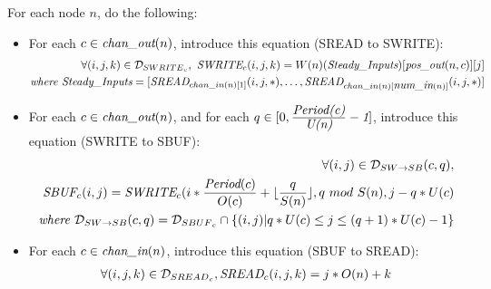 \noindent For each node $n$, do the following:
\begin{itemize}

\item For each $c \in \mbox{\it chan\_out}(n)$, introduce this equation
(SREAD to SWRITE):
%
\begin{align*}
\forall (i, j, k) \in {\cal D}_{{SWRITE}_{c}},~\mbox{\it SWRITE}_{c}(i,j,k) = W(n)(\mbox{\it Steady\_Inputs})[\mbox{\it pos\_out}(n, c)][j] \\
\mbox{\it where Steady\_Inputs} = [\mbox{\it SREAD}_{{chan\_in}(n)[1]}(i, j, *), \dots, 
                             \mbox{\it SREAD}_{{chan\_in}(n)[\mbox{\it num\_in}(n)]}(i, j, *) ]
\end{align*}
%
\item For each $c \in \mbox{\it chan\_out}(n)$, and for each $q \in
[0,\frac{\mbox{\it Period(c)}}{\mbox{\it U(n)}}-\mbox{\it 1}]$,
introduce this equation (SWRITE to SBUF):
\begin{align*}
\forall (i,j) \in {\cal D}_{SW {\small \rightarrow} SB}(c,q), \\
\mbox{\it SBUF}_{c}(i,j) = 
  \mbox{\it SWRITE}_{c}(i * \frac{\mbox{\it Period}(c)}{O(c)} + \lfloor \frac{q}{S(n)} \rfloor, q~mod~S(n),
                     j - q * U(c) \\
\mbox{\it where } {\cal D}_{SW {\small \rightarrow} SB}(c,q) = 
  {\cal D}_{{SBUF}_{c}} \cap 
  \{ (i,j) | q*U(c) \le j \le (q+1)*U(c) - 1 \}
\end{align*}

\item For each $c \in \mbox{\it chan\_in}(n)$, introduce this equation (SBUF to
SREAD):
\begin{align*}
\forall (i,j,k) \in {\cal D}_{{SREAD}_{c}},
\mbox{\it SREAD}_{c}(i,j,k) = j*O(n) + k
\end{align*}
\end{itemize}


